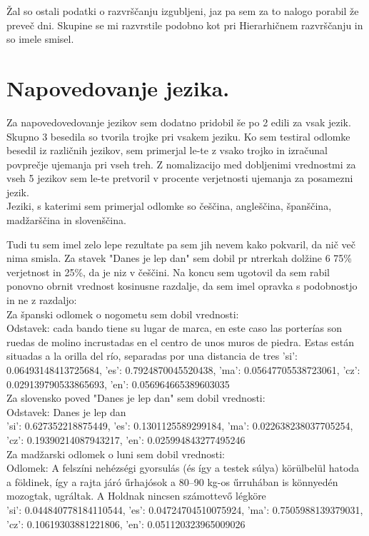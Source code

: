 \documentclass[a4paper,11pt]{article}
\begin{document}
Žal so ostali podatki o razvrščanju izgubljeni, jaz pa sem za to nalogo porabil že preveč dni.
Skupine se mi razvrstile podobno kot pri Hierarhičnem razvrščanju in so imele smisel.

\newpage


\section{Napovedovanje jezika.}
Za napovedovedovanje jezikov sem dodatno pridobil še po 2 edili za vsak jezik. Skupno 3 besedila so tvorila trojke pri vsakem jeziku.
Ko sem testiral odlomke besedil iz različnih jezikov, sem primerjal le-te z vsako trojko in izračunal povprečje ujemanja pri vseh treh.
Z nomalizacijo med dobljenimi vrednostmi za vseh 5 jezikov sem le-te pretvoril v procente verjetnosti ujemanja za posamezni jezik.
\\Jeziki, s katerimi sem primerjal odlomke so češčina, angleščina, španščina, madžarščina in slovenščina.


Tudi tu sem imel zelo lepe rezultate pa sem jih nevem kako pokvaril, da nič več nima smisla. Za stavek "Danes je lep dan" sem dobil pr ntrerkah dolžine 6 75\% verjetnost in
25\%, da je niz v češčini.
Na koncu sem ugotovil da sem rabil ponovno obrnit vrednost kosinusne razdalje, da sem imel opravka s podobnostjo in ne z razdaljo:
\\

Za španski odlomek o nogometu sem dobil vrednosti:
\\Odstavek: cada bando tiene su lugar de marca, en este caso las porterías son ruedas de molino incrustadas en el centro de unos muros de piedra. Estas están situadas a la orilla del río, separadas por una distancia de tres
{'si': 0.06493148413725684, 'es': 0.7924870045520438, 'ma': 0.05647705538723061, 'cz': 0.029139790533865693, 'en': 0.056964665389603035}
\\

Za slovensko poved "Danes je lep dan" sem dobil vrednosti:
\\Odstavek: Danes je lep dan
\\
{'si': 0.627352218875449, 'es': 0.1301125589299184, 'ma': 0.022638238037705254, 'cz': 0.19390214087943217, 'en': 0.025994843277495246}
\\

Za madžarski odlomek o luni sem dobil vrednosti:
\\Odlomek: A felszíni nehézségi gyorsulás (és így a testek súlya) körülbelül hatoda a földinek, így a rajta járó űrhajósok a 80–90 kg-os űrruhában is könnyedén mozogtak, ugráltak. A Holdnak nincsen számottevő légköre
\\
{'si': 0.044840778184110544, 'es': 0.04724704510075924, 'ma': 0.7505988139379031, 'cz': 0.10619303881221806, 'en': 0.051120323965009026}
\\
\end{document}
